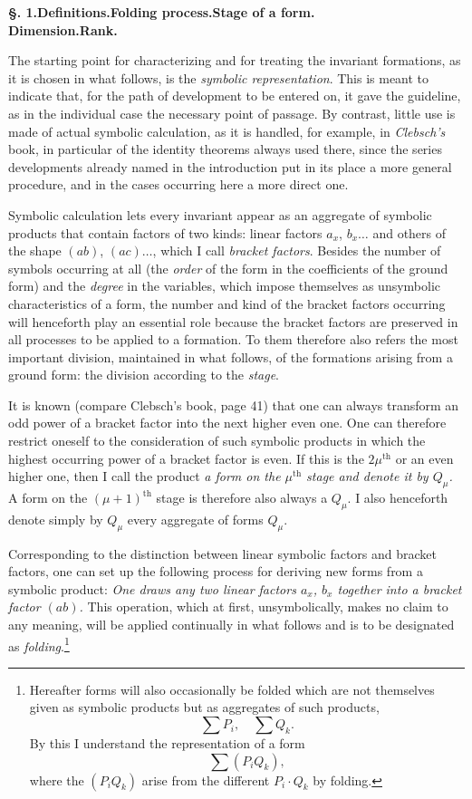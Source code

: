 \documentclass[10pt]{article}
\begin{document}
\begin{center}
{\bfseries §. 1.\quad Definitions.\quad Folding process.\quad Stage of a form.\\ Dimension.\quad Rank.}
\end{center}

The starting point for characterizing and for treating the invariant formations, as it is chosen in what follows, is the \emph{symbolic representation}. This is meant to indicate that, for the path of development to be entered on, it gave the guideline, as in the individual case the necessary point of passage. By contrast, little use is made of actual symbolic calculation, as it is handled, for example, in \emph{Clebsch's} book, in particular of the identity theorems always used there, since the series developments already named in the introduction put in its place a more general procedure, and in the cases occurring here a more direct one.

Symbolic calculation lets every invariant appear as an aggregate of symbolic products that contain factors of two kinds: linear factors $a_x$, $b_x\ldots$ and others of the shape $(ab)$, $(ac)\ldots$, which I call \emph{bracket factors}. Besides the number of symbols occurring at all (the \emph{order} of the form in the coefficients of the ground form) and the \emph{degree} in the variables, which impose themselves as unsymbolic characteristics of a form, the number and kind of the bracket factors occurring will henceforth play an essential role because the bracket factors are preserved in all processes to be applied to a formation. To them therefore also refers the most important division, maintained in what follows, of the formations arising from a ground form: the division according to the \emph{stage}.

It is known (compare Clebsch's book, page 41) that one can always transform an odd power of a bracket factor into the next higher even one. One can therefore restrict oneself to the consideration of such symbolic products in which the highest occurring power of a bracket factor is even. If this is the $2\mu^{\mathrm{th}}$ or an even higher one, then I call the product \emph{a form on the $\mu^{\mathrm{th}}$ stage and denote it by $Q_\mu$.} A form on the $(\mu+1)^{\mathrm{th}}$ stage is therefore also always a $Q_\mu$. I also henceforth denote simply by $Q_\mu$ every aggregate of forms $Q_\mu$.

Corresponding to the distinction between linear symbolic factors and bracket factors, one can set up the following process for deriving new forms from a symbolic product: \emph{One draws any two linear factors $a_x$, $b_x$ together into a bracket factor $(ab)$.} This operation, which at first, unsymbolically, makes no claim to any meaning, will be applied continually in what follows and is to be designated as \emph{folding}.\footnote{Hereafter forms will also occasionally be folded which are not themselves given as symbolic products but as aggregates of such products,
\[
\sum P_i,\quad \sum Q_k.
\]
By this I understand the representation of a form
\[
\sum(P_i Q_k),
\]
where the $(P_i Q_k)$ arise from the different $P_i\cdot Q_k$ by folding.}
\end{document}
